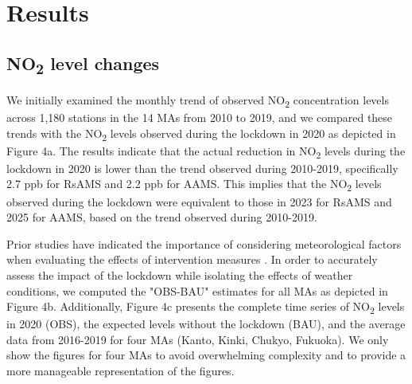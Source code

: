 \section{Results} \label{chap4_result}
\subsection{NO\textsubscript{2} level changes}
We initially examined the monthly trend of observed NO\textsubscript{2} concentration levels across 1,180 stations in the 14 MAs from 2010 to 2019, and we compared these trends with the NO\textsubscript{2} levels observed during the lockdown in 2020 as depicted in Figure 4a. The results indicate that the actual reduction in NO\textsubscript{2} levels during the lockdown in 2020 is lower than the trend observed during 2010-2019, specifically 2.7 ppb for RsAMS and 2.2 ppb for AAMS. This implies that the NO\textsubscript{2} levels observed during the lockdown were equivalent to those in 2023 for RsAMS and 2025 for AAMS, based on the trend observed during 2010-2019. \par

Prior studies have indicated the importance of considering meteorological factors when evaluating the effects of intervention measures \citep{ordonez2020early,grange2021covid,shi2021abrupt}. In order to accurately assess the impact of the lockdown while isolating the effects of weather conditions, we computed the "OBS-BAU" estimates for all MAs as depicted in Figure 4b. Additionally, Figure 4c presents the complete time series of NO\textsubscript{2} levels in 2020 (OBS), the expected levels without the lockdown (BAU), and the average data from 2016-2019 for four MAs (Kanto, Kinki, Chukyo, Fukuoka). We only show the figures for four MAs to avoid overwhelming complexity and to provide a more manageable representation of the figures. \par

